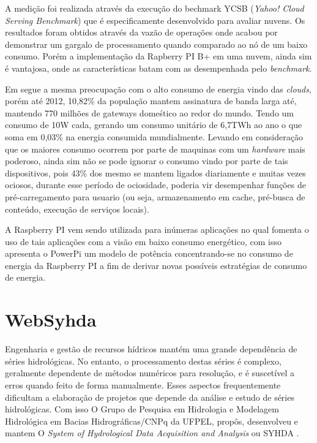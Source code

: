 \documentclass[12pt,english,brazil]{article}
\begin{document}
A medição foi realizada através da execução do bechmark YCSB (\textit{Yahoo! Cloud Serving Benchmark}) que é especificamente desenvolvido para avaliar nuvens. Os resultados foram obtidos através da vazão de operações onde acabou por demonstrar um gargalo de processamento quando comparado ao nó de um baixo consumo. Porém a implementação da Rapberry PI B+ em uma nuvem, ainda sim é vantajosa, onde as características batam com as desempenhada pelo \textit{benchmark}.


Em \cite{PiConsumo} segue a mesma preocupação com o alto consumo de energia vindo das \textit{clouds}, porém até 2012, 10,82\% da população mantem assinatura de banda larga até, mantendo 770 milhões de gateways domeśtico ao redor do mundo. Tendo um consumo de 10W cada, gerando um consumo unitário de 6,7TWh ao ano o que soma em 0,03\% na energia consumida mundialmente. Levando em consideração que os maiores consumo ocorrem por parte de maquinas com um \textit{hardware} mais poderoso, ainda sim não se pode ignorar o consumo vindo por parte de tais dispositivos, pois 43\% dos mesmo se mantem ligados diariamente e muitas vezes ociosos, durante esse período de ociosidade, poderia vir desempenhar funções de pré-carregamento para usuario (ou seja, armazenamento em cache, pré-busca de conteúdo, execução de serviços locais).


A Raspberry PI vem sendo utilizada para inúmeras aplicações no qual fomenta o uso de tais aplicações com a visão em baixo consumo energético, com isso \cite{PiConsumo} apresenta o PowerPi um modelo de  potência concentrando-se no consumo de energia da Raspberry PI a fim de derivar novas possíveis estratégias de consumo de energia.

\section{WebSyhda}\label{sec:websyhda}

Engenharia e gestão de recursos hídricos mantém uma grande dependência de séries hidrológicas. No entanto, o processamento destas séries é complexo, geralmente dependente de métodos numéricos para resolução, e é suscetível a erros quando feito de forma manualmente. Esses aspectos frequentemente dificultam a elaboração de projetos que depende da análise e estudo de séries hidrológicas. Com isso O Grupo de Pesquisa em Hidrologia e Modelagem Hidrológica em Bacias Hidrográficas/CNPq da UFPEL, propôs, desenvolveu e mantem O \emph{System of Hydrological Data Acquisition and Analysis} ou SYHDA \cite{syhda}.
\end{document}
